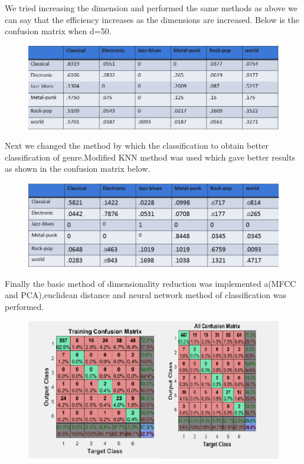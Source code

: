 \documentclass[12pt]{article}
\begin{document}
We tried increasing the dimension and performed the same methods as above we can say that the efficiency increases as the dimensions are increased. Below is the confusion matrix when d=50.
\begin{figure}[H]
\includegraphics [scale=0.7]{result3.png}
\end{figure}
Next we changed the method by which the classification to obtain better classification of genre.Modified KNN method was used which gave better results as shown in the confusion matrix below.
\begin{figure}[H]
\includegraphics [scale=0.7]{result4.png}
\end{figure}
Finally the basic method of dimensionality reduction was implemented a(MFCC and PCA),euclidean distance and neural network method of classification was performed.
\begin{figure}[H]
\includegraphics [scale=0.7]{result5.png}
\end{figure}
\end{document}
